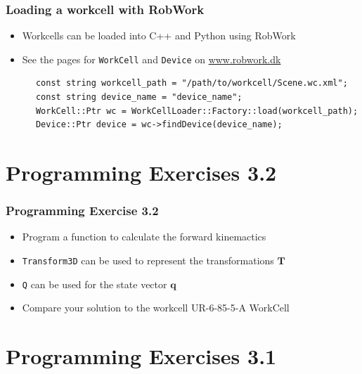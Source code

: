 \documentclass{beamer}
\begin{document}

\begin{frame}[fragile]
  \frametitle{Loading a workcell with RobWork}
  \begin{itemize}
  \item Workcells can be loaded into C++ and Python using RobWork
  \item See the pages for \texttt{WorkCell} and \texttt{Device} on \url{www.robwork.dk}
  \end{itemize}
  
  \begin{adjustbox}{width=\textwidth,keepaspectratio}
    \begin{lstlisting}
      const string workcell_path = "/path/to/workcell/Scene.wc.xml";
      const string device_name = "device_name";
      WorkCell::Ptr wc = WorkCellLoader::Factory::load(workcell_path);
      Device::Ptr device = wc->findDevice(device_name);
    \end{lstlisting}
  \end{adjustbox}
  
\end{frame}


\section{Programming Exercises 3.2}


\begin{frame}
  \frametitle{Programming Exercise 3.2}
  \begin{itemize}
  \item Program a function to calculate the forward kinemactics
  \item \texttt{Transform3D} can be used to represent the transformations $\mathbf{T}$
  \item \texttt{Q} can be used for the state vector $\mathbf{q}$
    \item Compare your solution to the workcell UR-6-85-5-A WorkCell
  \end{itemize}
\end{frame}



\section{Programming Exercises 3.1}
\end{document}
